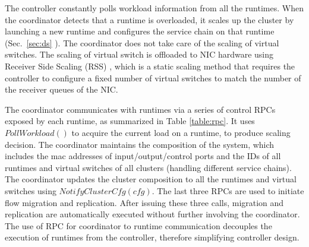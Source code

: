 The controller constantly polls workload information from all the runtimes. When the coordinator detects that a runtime is overloaded, it scales up the cluster by launching a new runtime and configures the service chain on that runtime (Sec.~\ref{sec:ds}%
). The coordinator does not take care of the scaling of virtual switches. The scaling of virtual switch is offloaded to NIC hardware using Receiver Side Scaling (RSS) \cite{rss, jeong2014mtcp}, which is a static scaling method that requires the controller to configure a fixed number of virtual switches to match the number of the receiver queues of the NIC.  %

The coordinator communicates with runtimes via a series of control RPCs exposed by each runtime, as summarized in Table \ref{table:rpc}. It uses $PollWorkload()$ to acquire the current load on a runtime, to produce scaling decision. The coordinator maintains the composition of the system, which includes the mac addresses of input/output/control ports and the IDs of all runtimes and virtual switches of all clusters (handling different service chains). The coordinator updates the cluster composition to all the runtimes and virtual switches using $NotifyClusterCfg(cfg)$. %
The last three RPCs are used to initiate flow migration and replication. After issuing these three calls, migration and replication are automatically executed without further involving the coordinator. The use of RPC for coordinator to runtime communication decouples the execution of runtimes from the controller, therefore simplifying controller design.



